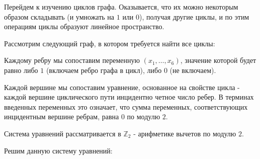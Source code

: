 \documentclass[russian]{lecture-notes}
\begin{document}
Перейдем к изучению циклов графа. Оказывается, что их можно некоторым образом складывать (и умножать на $1$ или $0$), получая другие циклы, и по этим операциям циклы образуют линейное пространство.

Рассмотрим следующий граф, в котором требуется найти все циклы:
\begin{figure}[H]
    \centering
    \label{pic:8}
\end{figure}

Каждому ребру мы сопоставим переменную $(x_1,\dotsc,x_6)$, значение которой будет равно либо $1$ (включаем ребро графа в цикл), либо $0$ (не включаем).

Каждой вершине мы сопоставим уравнение, основанное на свойстве цикла - каждой вершине циклического пути инцидентно четное число ребер. В терминах введенных переменных это означает, что сумма переменных, соответствующих инцидентным вершине ребрам, равна $0$ по модулю $2$.


\begin{note}
    Система уравнений рассматривается в $\mathbb{Z}_2$ - арифметике вычетов по модулю $2$.
\end{note}

Решим данную систему уравнений:
\end{document}
